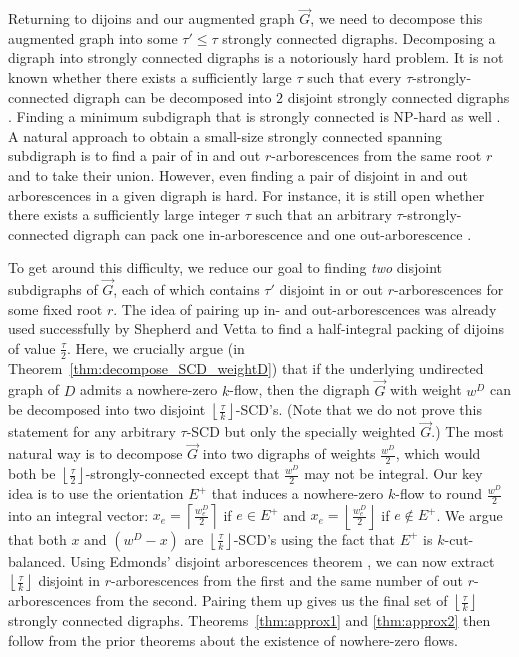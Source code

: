 \documentclass[runningheads]{llncs}
\newcommand{\rounddown}[1]{\left\lfloor#1\right\rfloor}
\newcommand{\roundup}[1]{\left\lceil#1\right\rceil}
\begin{document}
Returning to dijoins and our augmented graph $\vec{G}$, we need to decompose this augmented graph into some $\tau' \leq \tau$ strongly connected digraphs. 
Decomposing a digraph into strongly connected digraphs is a notoriously hard problem. It is not known whether there exists a sufficiently large $\tau$ such that every $\tau$-strongly-connected digraph can be decomposed into $2$ disjoint strongly connected digraphs \cite{bang2004decomposing}. Finding a minimum subdigraph that is strongly connected is NP-hard as well \cite{eswaran1976augmentation}. A natural approach to obtain a small-size strongly connected spanning subdigraph is to find a pair of in and out $r$-arborescences from the same root $r$ and to take their union. However, even finding a pair of disjoint in and out arborescences in a given digraph is hard. For instance, it is still open whether there exists a sufficiently large integer $\tau$ such that an arbitrary $\tau$-strongly-connected digraph can pack one in-arborescence and one out-arborescence \cite{bang2009disjoint}.

To get around this difficulty, we reduce our goal to finding {\em two} disjoint subdigraphs of $\vec{G}$, each of which contains $\tau'$ disjoint in or out $r$-arborescences for some fixed root $r$.
The idea of pairing up in- and out-arborescences was already used successfully by Shepherd and Vetta \cite{shepherd2005visualizing} to find a half-integral packing of dijoins of value $\frac{\tau}{2}$. Here, we crucially argue (in Theorem~\ref{thm:decompose_SCD_weightD}) that if the underlying undirected graph of $D$ admits a nowhere-zero $k$-flow, then the digraph $\vec{G}$ with weight $w^D$ can be decomposed into two disjoint $\rounddown{\frac{\tau}{k}}$-SCD's. (Note that we do not prove this statement for any arbitrary $\tau$-SCD but only the specially weighted $\vec{G}$.) The most natural way is to decompose $\vec{G}$ into two digraphs of weights $\frac{w^D}{2}$, which would both be $\rounddown{\frac{\tau}{2}}$-strongly-connected except that $\frac{w^D}{2}$ may not be integral. Our key idea is to use the orientation $E^+$ that induces a nowhere-zero $k$-flow to round $\frac{w^D}{2}$ into an integral vector: $x_e=\roundup{\frac{w^D_e}{2}}$ if $e\in E^+$ and $x_e=\rounddown{\frac{w^D_e}{2}}$ if $e\notin E^+$. We argue that both $x$ and $(w^D-x)$ are $\rounddown{\frac{\tau}{k}}$-SCD's using the fact that $E^+$ is $k$-cut-balanced. 
Using Edmonds' disjoint arborescences theorem \cite{edmonds1973edge}, we can now extract $\rounddown{\frac{\tau}{k}}$ disjoint in $r$-arborescences from the first and the same number of out $r$-arborescences from the second. Pairing them up gives us the final set of $\rounddown{\frac{\tau}{k}}$ strongly connected digraphs. 
Theorems~\ref{thm:approx1} and \ref{thm:approx2} then follow from the prior theorems about the existence of nowhere-zero flows.
\end{document}
